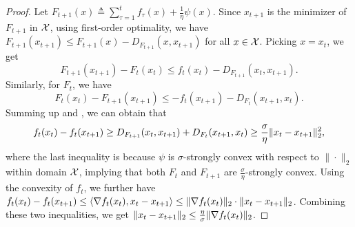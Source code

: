 \begin{proof}
    Let $F_{t+1}(x)\triangleq\sum_{\tau=1}^tf_\tau(x)+\frac{1}{\eta}\psi(x)$. Since $x_{t+1}$ is the minimizer of $F_{t+1}$ in ${\mathcal{X}}$, using first-order optimality, we have $F_{t+1}(x_{t+1})\le F_{t+1}(x)-D_{F_{t+1}}(x,x_{t+1})$ for all $x\in{\mathcal{X}}$. Picking $x=x_{t}$, we get
    \begin{equation}\label{eqn:bregman_1}
        F_{t+1}(x_{t+1}) - F_t(x_t) \le f_t(x_t) - D_{F_{t+1}}(x_t,x_{t+1}).
    \end{equation}
    Similarly, for $F_t$, we have
    \begin{equation}\label{eqn:bregman_2}
        F_t(x_t) - F_{t+1}(x_{t+1}) \le -f_t(x_{t+1}) - D_{F_t}(x_{t+1},x_t).
    \end{equation}
    Summing up  and , we can obtain that
    \begin{align*}
        f_t(x_t)-f_t(x_{t+1}) \ge D_{F_{t+1}}(x_t,x_{t+1}) + D_{F_t}(x_{t+1},x_t)\ge \frac{\sigma}{\eta}\lVert x_t-x_{t+1}\rVert_2^2,
    \end{align*}
    where the last inequality is because $\psi$ is $\sigma$-strongly convex with respect to $\|\cdot\|_2$ within domain ${\mathcal{X}}$, implying that both $F_t$ and $F_{t+1}$ are $\frac{\sigma}{\eta}$-strongly convex.
    Using the convexity of $f_t$, we further have $f_t(x_t)-f_t(x_{t+1})\le \langle \nabla f_t(x_t), x_t-x_{t+1} \rangle\le \lVert\nabla f_t(x_t)\rVert_2\cdot \lVert x_t-x_{t+1}\rVert_2$. Combining these two inequalities, we get $\lVert x_t-x_{t+1}\rVert_2 \le \frac{\eta}{\sigma}\lVert\nabla f_t(x_t)\rVert_2$.
    \end{proof}

